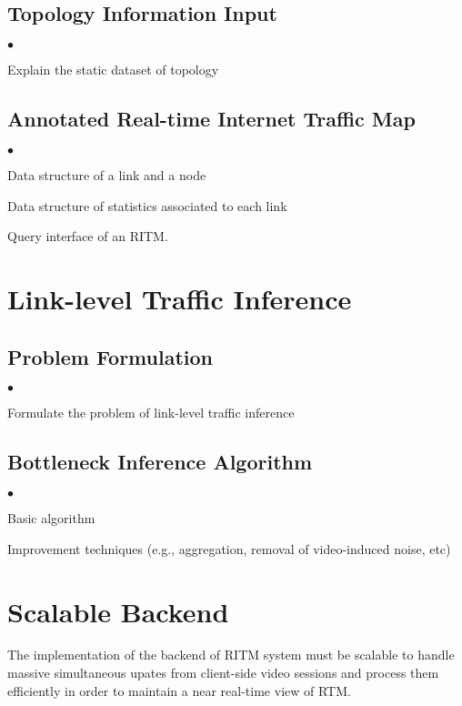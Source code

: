 \documentclass[10pt,twocolumn]{article}
\newenvironment{packeditemize}{\begin{list}{$\bullet$}{\setlength{\itemsep}{0.5pt}\addtolength{\labelwidth}{-4pt}\setlength{\leftmargin}{\labelwidth}\setlength{\listparindent}{\parindent}\setlength{\parsep}{1pt}\setlength{\topsep}{0pt}}}{\end{list}}
\begin{document}
\subsection{Topology Information Input}
\begin{packeditemize}
	\item Explain the static dataset of topology
\end{packeditemize}

\subsection{Annotated Real-time Internet Traffic Map}
\begin{packeditemize}
	\item Data structure of a link and a node
	\item Data structure of statistics associated to each link
	\item Query interface of an RITM.
\end{packeditemize}

\section{Link-level Traffic Inference}
\subsection{Problem Formulation}
\begin{packeditemize}
	\item Formulate the problem of link-level traffic inference
\end{packeditemize}

\subsection{Bottleneck Inference Algorithm}
\begin{packeditemize}
	\item Basic algorithm
	\item Improvement techniques (e.g., aggregation, removal of video-induced noise, etc)
\end{packeditemize}


\section{Scalable Backend}
The implementation of the backend of RITM system must be scalable to handle massive simultaneous upates from client-side video sessions and process them efficiently in order to maintain a near real-time view of RTM.
\end{document}

